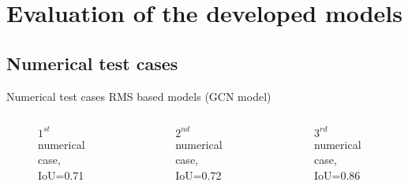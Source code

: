 \documentclass[10pt,aspectratio=169,dvipsnames]{beamer} %
\begin{document}
		\section{Evaluation of the developed models}
		\subsection{Numerical test cases}
		\begin{frame}{Numerical test cases RMS based models (GCN model)}
			\begin{columns}[T]
				\begin{column}[c]{0.32\textwidth}
					\begin{figure}[c]
						\centering
						\caption{\(1^{st}\) numerical case, IoU=0.71}
					\end{figure}
				\end{column}
				\hfill
				\begin{column}[c]{0.32\textwidth}
					\begin{figure}[c]
						\centering
						\caption{\(2^{nd}\) numerical case, IoU=0.72}
					\end{figure}
				\end{column}
				\hfill
				\begin{column}[c]{0.32\textwidth}
					\begin{figure}[c]
						\centering
						\caption{\(3^{rd}\) numerical case, IoU=0.86}
					\end{figure}					
				\end{column}
			\end{columns}
		\end{frame}
\end{document}
